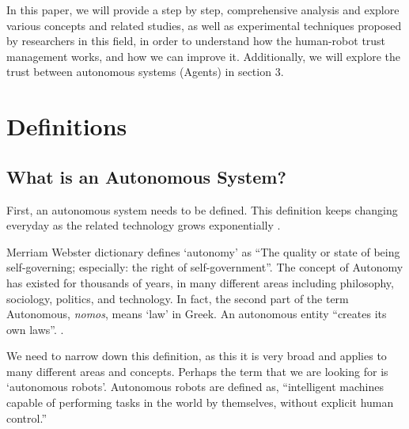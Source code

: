 \documentclass[runningheads,a4paper]{llncs}
\begin{document}
In this paper, we will provide a step by step, comprehensive analysis and explore various concepts and related studies, as well as experimental techniques proposed by researchers in this field, in order to understand how the human-robot trust management works, and how we can improve it. Additionally, we will explore the trust between autonomous systems (Agents) in section 3.

\section{Definitions}
\subsection{What is an Autonomous System?}
First, an autonomous system needs to be defined. This definition keeps changing everyday as the related technology grows exponentially \cite{schaefer2013perception}.

Merriam Webster dictionary defines `autonomy' as  ``The quality or state of being self-governing; especially: the right of self-government''. The concept of Autonomy has existed for thousands of years, in many different areas including philosophy, sociology, politics, and technology. In fact, the second part of the term Autonomous, \textsl{nomos}, means `law' in  Greek. An autonomous entity ``creates its own laws''. \cite{MerriamWebsterAtn}. 

We need to narrow down this definition, as this it is very broad and applies to many different areas and concepts. Perhaps the term that we are looking for is `autonomous robots'. Autonomous robots are defined as, ``intelligent machines capable of performing tasks in the world by themselves, without explicit human control.'' \cite{Bekey:2005:ARB:1088950}
\end{document}
